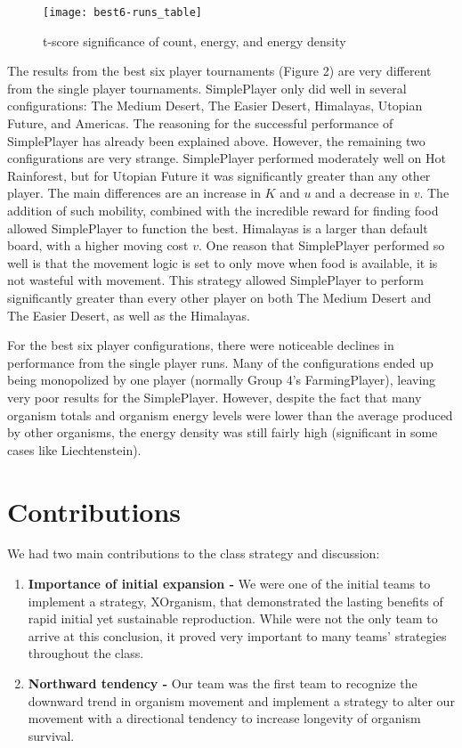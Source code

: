 \documentclass[
10pt, %
letterpaper, %
oneside, %
headinclude,footinclude, %
english
]{article}
\begin{document}
\pagebreak

\begin{figure}[h]
\centering
\texttt{[image: best6-runs\_table]}
\caption[Table of t-score statistics for Best Six Tournaments]{t-score significance of count, energy, and energy density}
\label{fig:gallery2}
\end{figure}

The results from the best six player tournaments (Figure 2) are very different from the single player tournaments. SimplePlayer only did well in several configurations: The Medium Desert, The Easier Desert, Himalayas, Utopian Future, and Americas. The reasoning for the successful performance of SimplePlayer has already been explained above. However, the remaining two configurations are very strange. SimplePlayer performed moderately well on Hot Rainforest, but for Utopian Future it was significantly greater than any other player. The main differences are an increase in $K$ and $u$ and a decrease in $v$. The addition of such mobility, combined with the incredible reward for finding food allowed SimplePlayer to function the best. Himalayas is a larger than default board, with a higher moving cost $v$. One reason that SimplePlayer performed so well is that the movement logic is set to only move when food is available, it is not wasteful with movement. This strategy allowed SimplePlayer to perform significantly greater than every other player on both The Medium Desert and The Easier Desert, as well as the Himalayas.

For the best six player configurations, there were noticeable declines in performance from the single player runs. Many of the configurations ended up being monopolized by one player (normally Group 4's FarmingPlayer), leaving very poor results for the SimplePlayer. However, despite the fact that many organism totals and organism energy levels were lower than the average produced by other organisms, the energy density was still fairly high (significant in some cases like Liechtenstein).



\section{Contributions}

We had two main contributions to the class strategy and discussion:
\begin{enumerate}
  \item \textbf{Importance of initial expansion -} We were one of the initial teams to implement a strategy, XOrganism, that demonstrated the lasting benefits of rapid initial yet sustainable reproduction. While were not the only team to arrive at this conclusion, it proved very important to many teams' strategies throughout the class.
  \item \textbf{Northward tendency -} Our team was the first team to recognize the downward trend in organism movement and implement a strategy to alter our movement with a directional tendency to increase longevity of organism survival.
\end{enumerate}
\end{document}
